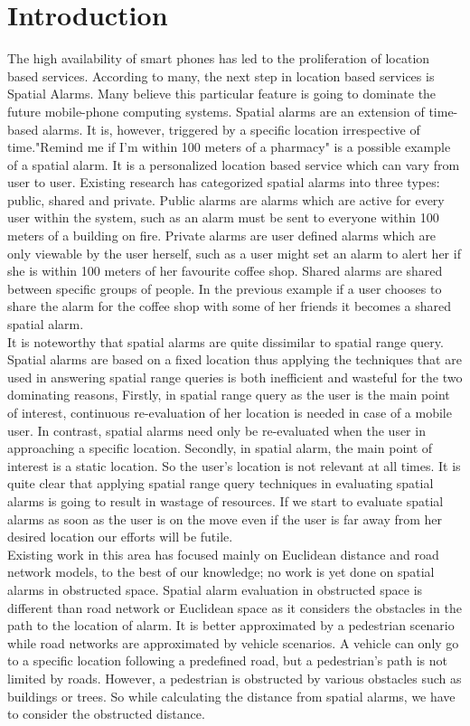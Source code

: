\documentclass{sig-alternate}
\begin{document}
\section{Introduction}
The high availability of smart phones has led to the proliferation of location based services. According to many, the next step in location based services is Spatial Alarms. Many believe this particular feature is going to dominate the future mobile-phone computing systems. Spatial alarms are an extension of time-based alarms. It is, however, triggered by a specific location irrespective of time."Remind me if I'm within 100 meters of a pharmacy" is a possible example of a spatial alarm. It is a personalized location based service which can vary from user to user. Existing research has categorized spatial alarms into three types: public, shared and private. Public alarms are alarms which are active for every user within the system, such as an alarm must be sent to everyone within 100 meters of a building on fire. Private alarms are user defined alarms which are only viewable by the user herself, such as a user might set an alarm to alert her if she is within 100 meters of her favourite coffee shop. Shared alarms are shared between specific groups of people. In the previous example if a user chooses to share the alarm for the coffee shop with some of her friends it becomes a shared spatial alarm.\\
It is noteworthy that spatial alarms are quite dissimilar to spatial range query. Spatial alarms are based on a fixed location thus applying the techniques that are used in answering spatial range queries is both inefficient and wasteful for the two dominating reasons, Firstly, in spatial range query as the user is the main point of interest, continuous re-evaluation of her location is needed in case of a mobile user. In contrast, spatial alarms need only be re-evaluated when the user in approaching a specific location. Secondly, in spatial alarm, the main point of interest is a static location. So the user's location is not relevant at all times. It is quite clear that applying spatial range query techniques in evaluating spatial alarms is going to result in wastage of resources. If we start to evaluate spatial alarms as soon as the user is on the move even if the user is far away from her desired location our efforts will be futile. \\
Existing work in this area has focused mainly on Euclidean distance and road network models, to the best of our knowledge; no work is yet done on spatial alarms in obstructed space. Spatial alarm evaluation in obstructed space is different than road network or Euclidean space as it considers the obstacles in the path to the location of alarm. It is better approximated by a pedestrian scenario while road networks are approximated by vehicle scenarios. A vehicle can only go to a specific location following a predefined road, but a pedestrian's path is not limited by roads. However, a pedestrian is obstructed by various obstacles such as buildings or trees. So while calculating the distance from spatial alarms, we have to consider the obstructed distance.\\
\end{document}
